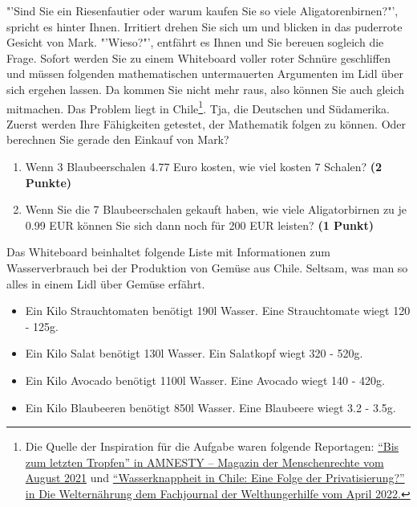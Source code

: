 \documentclass[a4paper, 9pt]{scrartcl}\usepackage[]{graphicx}\usepackage[]{xcolor}
\begin{document}
"'Sind Sie ein Riesenfautier oder warum kaufen Sie so viele Aligatorenbirnen?"', spricht es hinter Ihnen. Irritiert drehen Sie sich um und blicken in das puderrote Gesicht von Mark. "'Wieso?"', entfährt es Ihnen und Sie bereuen sogleich die Frage. Sofort werden Sie zu einem Whiteboard voller roter Schnüre geschliffen und müssen folgenden mathematischen untermauerten Argumenten im Lidl über sich ergehen lassen. Da kommen Sie nicht mehr raus, also können Sie auch gleich mitmachen. Das Problem liegt in Chile\footnote{Die Quelle der Inspiration für die Aufgabe waren folgende Reportagen: \href{https://www.amnesty.ch/de/ueber-amnesty/publikationen/magazin-amnesty/2021-3/bis-zum-letzten-tropfen}{"`Bis zum letzten Tropfen"' in AMNESTY – Magazin der Menschenrechte vom August 2021} und \href{https://www.welthungerhilfe.de/welternaehrung/rubriken/klima-ressourcen/wassernot-in-chile-eine-folge-der-privatisierung}{"`Wasserknappheit in Chile: Eine Folge der Privatisierung?"' in Die Welternährung dem Fachjournal der Welthungerhilfe vom April 2022.}}. Tja, die Deutschen und Südamerika.\\

Zuerst werden Ihre Fähigkeiten getestet, der Mathematik folgen zu können. Oder berechnen Sie gerade den Einkauf von Mark?\\

\begin{enumerate}
\item Wenn 3 Blaubeerschalen 4.77 Euro kosten,  wie viel kosten 7 Schalen? \textbf{(2 Punkte)}
\item Wenn Sie die 7 Blaubeerschalen gekauft haben, wie viele Aligatorbirnen zu je 0.99 EUR können Sie sich dann noch für 200 EUR leisten? \textbf{(1 Punkt)}
\end{enumerate}

Das Whiteboard beinhaltet folgende Liste mit Informationen zum Wasserverbrauch bei der Produktion von Gemüse aus Chile. Seltsam, was man so alles in einem Lidl über Gemüse erfährt.
  
\begin{itemize}[noitemsep]
\item Ein Kilo Strauchtomaten benötigt 190l Wasser. Eine Strauchtomate wiegt 120 - 125g.
\item Ein Kilo Salat benötigt 130l Wasser. Ein Salatkopf wiegt 320 - 520g.
\item Ein Kilo Avocado benötigt 1100l Wasser. Eine Avocado wiegt 140 - 420g.
\item Ein Kilo Blaubeeren benötigt 850l Wasser. Eine Blaubeere wiegt 3.2 - 3.5g.
\end{itemize}
\end{document}
